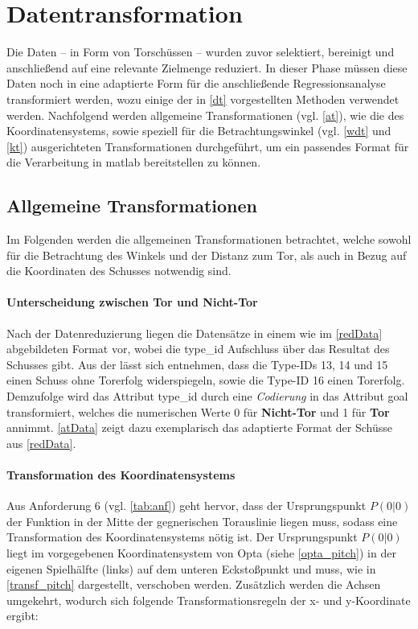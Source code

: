 \section{Datentransformation}
\label{dt}
Die Daten -- in Form von Torschüssen -- wurden zuvor selektiert, bereinigt und anschließend auf eine relevante Zielmenge reduziert. In dieser Phase müssen diese Daten noch in eine adaptierte Form für die anschließende Regressionsanalyse transformiert werden, wozu einige der in \vref{dt} vorgestellten Methoden verwendet werden. Nachfolgend werden allgemeine Transformationen (vgl. \vref{at}), wie die des Koordinatensystems, sowie speziell für die Betrachtungswinkel (vgl. \vref{wdt} und \vref{kt}) ausgerichteten Transformationen durchgeführt, um ein passendes Format für die Verarbeitung in \gls{matlab} bereitstellen zu können.


\subsection{Allgemeine Transformationen}
\label{at}
Im Folgenden werden die allgemeinen Transformationen betrachtet, welche sowohl für die Betrachtung des Winkels und der Distanz zum Tor, als auch in Bezug auf die Koordinaten des Schusses notwendig sind.

\paragraph{Unterscheidung zwischen Tor und Nicht-Tor} Nach der Datenreduzierung liegen die Datensätze in einem wie im \vref{redData} abgebildeten Format vor, wobei die \textsf{type\_id} Aufschluss über das Resultat des Schusses gibt. Aus der  lässt sich entnehmen, dass die Type-IDs \textsf{13, 14} und \textsf{15} einen Schuss ohne Torerfolg widerspiegeln, sowie die Type-ID \textsf{16} einen Torerfolg. Demzufolge wird das Attribut \textsf{type\_id} durch eine \textit{Codierung} in das Attribut \textsf{goal} transformiert, welches die numerischen Werte \textsf{0} für \textbf{Nicht-Tor} und \textsf{1} für \textbf{Tor} annimmt. \vref{atData} zeigt dazu exemplarisch das adaptierte Format der Schüsse aus \vref{redData}.

\paragraph{Transformation des Koordinatensystems}
Aus Anforderung 6 (vgl. \vref{tab:anf}) geht hervor, dass der Ursprungspunkt $P(0|0)$ der Funktion in der Mitte der gegnerischen Torauslinie liegen muss, sodass eine Transformation des Koordinatensystems nötig ist. Der Ursprungspunkt $P(0|0)$ liegt im  vorgegebenen Koordinatensystem von Opta (siehe \vref{opta_pitch}) in der eigenen Spielhälfte (links) auf dem unteren Eckstoßpunkt und muss, wie in \vref{transf_pitch} dargestellt, verschoben werden. Zusätzlich werden die Achsen umgekehrt, wodurch sich folgende Transformationsregeln der x- und y-Koordinate ergibt:\enlargethispage{\baselineskip}\newline

